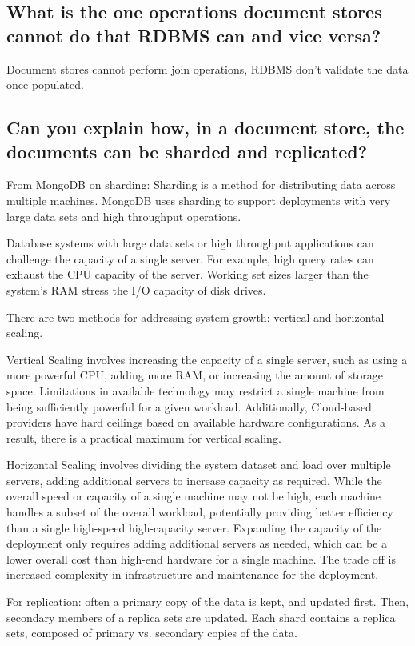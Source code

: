 \documentclass{article}
\begin{document}
\subsection{What is the one operations document stores cannot do that RDBMS can and vice versa? }

Document stores cannot perform join operations, RDBMS don't validate the data once populated.

\subsection{Can you explain how, in a document store, the documents can be sharded and replicated?}

From MongoDB on sharding:
Sharding is a method for distributing data across multiple machines. MongoDB uses sharding to support deployments with very large data sets and high throughput operations.

Database systems with large data sets or high throughput applications can challenge the capacity of a single server. For example, high query rates can exhaust the CPU capacity of the server. Working set sizes larger than the system’s RAM stress the I/O capacity of disk drives.

There are two methods for addressing system growth: vertical and horizontal scaling.

Vertical Scaling involves increasing the capacity of a single server, such as using a more powerful CPU, adding more RAM, or increasing the amount of storage space. Limitations in available technology may restrict a single machine from being sufficiently powerful for a given workload. Additionally, Cloud-based providers have hard ceilings based on available hardware configurations. As a result, there is a practical maximum for vertical scaling.

Horizontal Scaling involves dividing the system dataset and load over multiple servers, adding additional servers to increase capacity as required. While the overall speed or capacity of a single machine may not be high, each machine handles a subset of the overall workload, potentially providing better efficiency than a single high-speed high-capacity server. Expanding the capacity of the deployment only requires adding additional servers as needed, which can be a lower overall cost than high-end hardware for a single machine. The trade off is increased complexity in infrastructure and maintenance for the deployment.

For replication: often a primary copy of the data is kept, and updated first. Then, secondary members of a replica sets are updated. Each shard contains a replica sets, composed of primary vs. secondary copies of the data.
\end{document}
